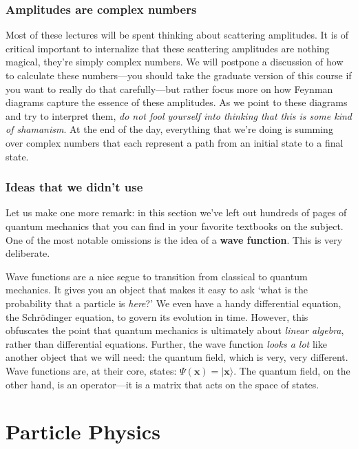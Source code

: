 \documentclass[12pt]{article}
\numberwithin{equation}{section}    %
\renewcommand{\vec}[1]{\mathbf{#1}} %
\theoremstyle{definition}
\begin{document}
\subsubsection{Amplitudes are complex numbers}

Most of these lectures will be spent thinking about scattering amplitudes. It is of critical important to internalize that these scattering amplitudes are nothing magical, they're simply complex numbers. We will postpone a discussion of how to calculate these numbers---you should take the graduate version of this course if you want to really do that carefully---but rather focus more on how Feynman diagrams capture the essence of these amplitudes. As we point to these diagrams and try to interpret them, \emph{do not fool yourself into thinking that this is some kind of shamanism}. At the end of the day, everything that we're doing is summing over complex numbers that each represent a path from an initial state to a final state.



\subsubsection{Ideas that we didn't use}

Let us make one more remark: in this section we've left out hundreds of pages of quantum mechanics that you can find in your favorite textbooks on the subject. One of the most notable omissions is the idea of a \textbf{wave function}. This is very deliberate. 

Wave functions are a nice segue to transition from classical to quantum mechanics. It gives you an object that makes it easy to ask `what is the probability that a particle is \emph{here}?' We even have a handy differential equation, the Schr\"odinger equation, to govern its evolution in time. However, this obfuscates the point that quantum mechanics is ultimately about \emph{linear algebra}, rather than differential equations. Further, the wave function \emph{looks a lot} like another object that we will need: the quantum field, which is very, very different. Wave functions are, at their core, states: $\Psi(\vec x) = |\vec x\rangle$. The quantum field, on the other hand, is an operator---it is a matrix that acts on the space of states. 





\section{Particle Physics}
\label{sec:preliminaries:particles}
\end{document}
